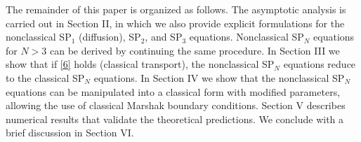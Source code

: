 \documentclass{anstrans}
\begin{document}
The remainder of this paper is organized as follows.
The asymptotic analysis is carried out in Section II, in which we also provide explicit formulations for the nonclassical SP$_1$ (diffusion), SP$_2$, and SP$_3$ equations. 
Nonclassical SP$_N$ equations for $N > 3$ can be derived by continuing the same procedure.
In Section III we show that if \cref{6} holds (classical transport), the nonclassical SP$_N$ equations reduce to the classical SP$_N$ equations.
In Section IV we show that the nonclassical SP$_N$ equations can be manipulated into a classical form with modified parameters, allowing the use of classical Marshak boundary conditions.  
Section V describes numerical results that validate the theoretical predictions.
We conclude with a brief discussion in Section VI.


\end{document}
